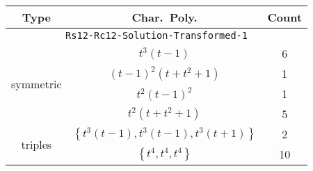 \documentclass{article}
\begin{document}
\begin{table}
    \begin{tabular}{|c|c|c|}
    \hline
    \textbf{Type} & \textbf{Char.~Poly.} & \textbf{Count} \\
    \hline \multicolumn{3}{|c|}{\texttt{Rs12-Rc12-Solution-Transformed-1}} \\ \hline
    \multirow{4}{*}{symmetric}
    & $t^3(t - 1)$ & 6 \\
    & $(t - 1)^2(t + t^2 + 1)$ & 1 \\
    & $t^2(t - 1)^2$ & 1 \\
    & $t^2(t + t^2 + 1)$ & 5 \\
    \hline
    \multirow{2}{*}{triples}
     & $\left\{t^3(t - 1),t^3(t - 1),t^3(t + 1)\right\}$ & 2 \\
     & $\left\{t^4,t^4,t^4\right\}$ & 10 \\
    \hline
    \end{tabular}
\end{table}
\end{document}
